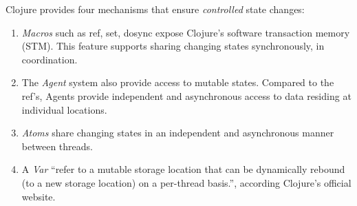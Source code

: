 \documentclass[12pt]{article}
\begin{document}



Clojure provides four mechanisms that ensure {\it controlled} state changes:
\begin{enumerate}
\item {\it Macros} such as ref, set, dosync expose Clojure's software transaction memory (STM). This feature supports sharing changing states synchronously, in coordination.
\item The {\it Agent} system also provide access to mutable states. Compared to the ref's, Agents provide independent and asynchronous access to data residing at individual locations.
\item {\it Atoms} share changing states in an independent and asynchronous manner between threads. 
\item A {\it Var} ``refer to a mutable storage location that can be dynamically rebound (to a new storage location) on a per-thread basis.'', according Clojure's official website.
\end{enumerate}
    
   
\end{document}
